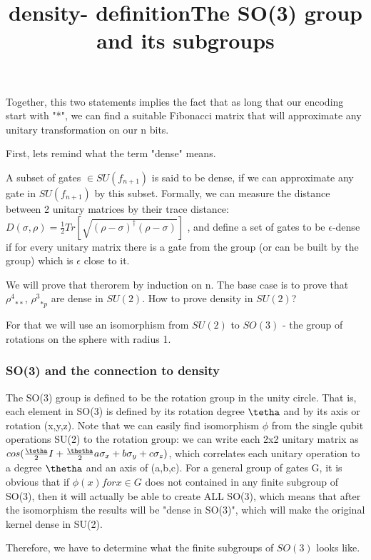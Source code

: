 \documentclass{article}
\begin{document}
Together, this two statements implies the fact that as long that our encoding start with "*", we can find a suitable Fibonacci matrix that will approximate any unitary transformation on our n bits.

First, lets remind what the term "dense" means. 
\title{density- definition}
A subset of gates $\in SU(f_{n+1})$ is said to be dense, if we can approximate any gate in $ SU(f_{n+1})$ by this subset. Formally, we can measure the distance between 2 unitary matrices by their trace distance: 
$D(\sigma, \rho) = \frac{1}{2}Tr[\sqrt{(\rho - \sigma)^{\dagger}(\rho - \sigma)}]$
, and define a set of gates to be $\epsilon$-dense if for every unitary matrix there is a gate from the group (or can be built by the group) which is $\epsilon$ close to it.

We will prove that therorem by induction on n. The base case is to prove that ${\rho^{4}}_{**}$, ${\rho^{3}}_{*p}$ are dense in $SU(2)$. How to prove density in $SU(2)$?

For that we will use an isomorphism from $SU(2)$ to $SO(3)$ - the group of rotations on the sphere with radius 1.


\subsubsection{SO(3) and the connection to density}

\title {The SO(3) group and its subgroups}
The SO(3) group is defined to be the rotation group in the unity circle. That is, each element in SO(3) is defined by its rotation degree $\tetha$ and by its axis or rotation (x,y,z). Note that we can easily find isomorphism $\phi$ from the single qubit operations SU(2) to the rotation group: we can write each 2x2 unitary matrix as $cos(\frac{\tetha}{2}I + \frac{\thetha}{2}{a\sigma_{x} + b\sigma_{y} + c\sigma_{z}})$, which correlates each unitary operation to a degree $\thetha$ and an axis of (a,b,c). For a general group of gates G, it is obvious that if ${\phi(x) for x \in G}$ does not contained in any finite subgroup of SO(3), then it will actually be able to create ALL SO(3), which means that after the isomorphism the results will be "dense in SO(3)", which will make the original kernel dense in SU(2).

Therefore, we have to determine what the finite subgroups of $SO(3)$ looks like.
\end{document}
